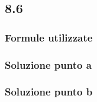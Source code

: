 \documentclass[../../main.tex]{subfiles}
\begin{document}
\subsection*{8.6}
\subsubsection*{Formule utilizzate}
\subsubsection*{Soluzione punto a}
\subsubsection*{Soluzione punto b}
\newpage
\end{document}

